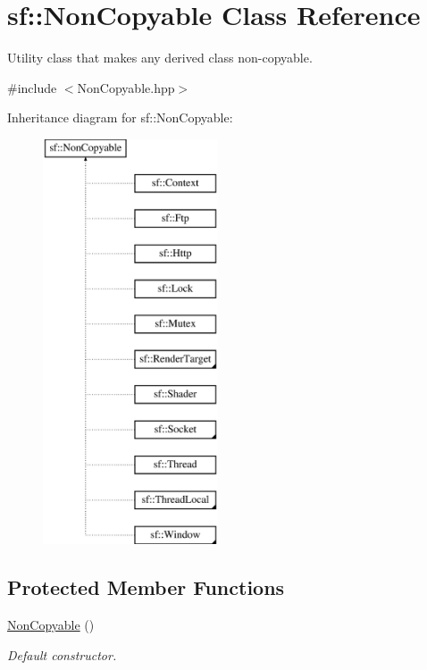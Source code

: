 \hypertarget{classsf_1_1NonCopyable}{\section{sf\-:\-:Non\-Copyable Class Reference}
\label{classsf_1_1NonCopyable}
}


Utility class that makes any derived class non-\/copyable.  




{\ttfamily \#include $<$Non\-Copyable.\-hpp$>$}

Inheritance diagram for sf\-:\-:Non\-Copyable\-:\begin{figure}[H]
\begin{center}
\leavevmode
\includegraphics[height=12.000000cm]{classsf_1_1NonCopyable}
\end{center}
\end{figure}
\subsection*{Protected Member Functions}
\begin{DoxyCompactItemize}
\item 
\hyperlink{classsf_1_1NonCopyable_a2110add170580fdb946f887719da6860}{Non\-Copyable} ()
\begin{DoxyCompactList}\small\item\em Default constructor. \end{DoxyCompactList}\end{DoxyCompactItemize}


